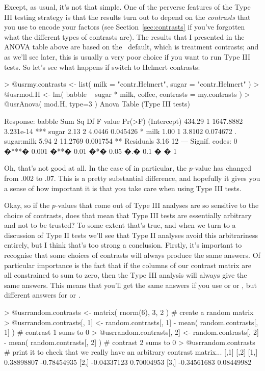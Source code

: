 Except, as usual, it's not that simple. One of the perverse features of the Type III testing strategy is that the results turn out to depend on the {\it contrasts} that you use to encode your factors (see Section~\ref{sec:contrasts} if you've forgotten what the different types of contrasts are). The results that I presented in the ANOVA table above are based on the \R\ default, which is treatment contrasts; and as we'll see later, this is usually a very poor choice if you want to run Type III tests. So let's see what happens if switch to Helmert contrasts:
\begin{rblock1}
> @usr{my.contrasts <- list( milk = "contr.Helmert", sugar = "contr.Helmert" )}
> @usr{mod.H <- lm( babble ~ sugar * milk, coffee, contrasts = my.contrasts )}
> @usr{Anova( mod.H, type=3 )}
Anova Table (Type III tests)

Response: babble
            Sum Sq Df   F value    Pr(>F)    
(Intercept) 434.29  1 1647.8882 3.231e-14 ***
sugar         2.13  2    4.0446  0.045426 *  
milk          1.00  1    3.8102  0.074672 .  
sugar:milk    5.94  2   11.2769  0.001754 ** 
Residuals     3.16 12                        
---
Signif. codes:  0 �***� 0.001 �**� 0.01 �*� 0.05 �.� 0.1 � � 1 
\end{rblock1}
Oh, that's not good at all. In the case of  in particular, the $p$-value has changed from .002 to .07. This is a pretty substantial difference, and hopefully it gives you a sense of how important it is that you take care when using Type III tests. 

Okay, so if the $p$-values that come out of Type III analyses are so sensitive to the choice of contrasts, does that mean that Type III tests are essentially arbitrary and not to be trusted? To some extent that's true, and when we turn to a discussion of Type II tests we'll see that Type II analyses avoid this arbitrariness entirely, but I think that's too strong a conclusion. Firstly, it's important to recognise that some choices of contrasts will always produce the same answers. Of particular importance is the fact that if the columns of our contrast matrix are all constrained to sum to zero, then the Type III analysis will always give the same answers. This means that you'll get the same answers if you use  or  or , but different answers for  or . 

\begin{rblock1}
> @usr{random.contrasts <- matrix( rnorm(6), 3, 2 ) }  # create a random matrix
> @usr{random.contrasts[, 1] <- random.contrasts[, 1] - mean( random.contrasts[, 1] )} # contrast 1 sums to 0
> @usr{random.contrasts[, 2] <- random.contrasts[, 2] - mean( random.contrasts[, 2] )} # contrast 2 sums to 0
> @usr{random.contrasts}  # print it to check that we really have an arbitrary contrast matrix...
            [,1]        [,2]
[1,]  0.38898807 -0.78454935
[2,] -0.04337123  0.70004953
[3,] -0.34561683  0.08449982
\end{rblock1}

